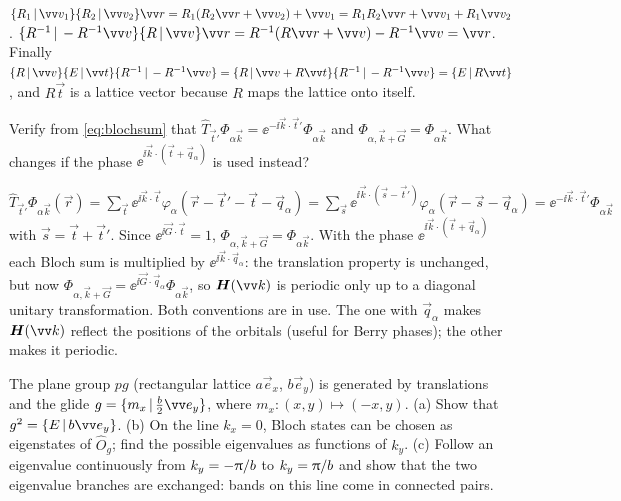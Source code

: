 \begin{solution}
$\seitz{R_1}{\vec{v}_1}\seitz{R_2}{\vec{v}_2}\vec{r}=R_1(R_2\vec{r}+\vec{v}_2)+\vec{v}_1
=R_1R_2\vec{r}+\vec{v}_1+R_1\vec{v}_2$.
$\seitz{R^{-1}}{-R^{-1}\vec{v}}\seitz{R}{\vec{v}}\vec{r}=R^{-1}(R\vec{r}+\vec{v})-R^{-1}\vec{v}=\vec{r}$.
Finally
$\seitz{R}{\vec{v}}\seitz{E}{\vec{t}}\seitz{R^{-1}}{-R^{-1}\vec{v}}
=\seitz{R}{\vec{v}+R\vec{t}}\seitz{R^{-1}}{-R^{-1}\vec{v}}=\seitz{E}{R\vec{t}}$, and $R\vec{t}$ is a
lattice vector because $R$ maps the lattice onto itself.
\end{solution}

\begin{exercise}\label{ex:6:bloch}
Verify from \eqref{eq:blochsum} that $\hat{T}_{\vec{t}'}\Phi_{\alpha\vec{k}}=
\ee^{-\ii\vec{k}\cdot\vec{t}'}\Phi_{\alpha\vec{k}}$ and $\Phi_{\alpha,\vec{k}+\vec{G}}=
\Phi_{\alpha\vec{k}}$. What changes if the phase $\ee^{\ii\vec{k}\cdot(\vec{t}+\vec{q}_\alpha)}$
is used instead?
\end{exercise}

\begin{solution}
$\hat{T}_{\vec{t}'}\Phi_{\alpha\vec{k}}(\vec{r})=\sum_{\vec{t}}\ee^{\ii\vec{k}\cdot\vec{t}}
\varphi_\alpha(\vec{r}-\vec{t}'-\vec{t}-\vec{q}_\alpha)=\sum_{\vec{s}}\ee^{\ii\vec{k}\cdot(\vec{s}-\vec{t}')}
\varphi_\alpha(\vec{r}-\vec{s}-\vec{q}_\alpha)=\ee^{-\ii\vec{k}\cdot\vec{t}'}\Phi_{\alpha\vec{k}}$
with $\vec{s}=\vec{t}+\vec{t}'$. Since $\ee^{\ii\vec{G}\cdot\vec{t}}=1$, $\Phi_{\alpha,\vec{k}+\vec{G}}=\Phi_{\alpha\vec{k}}$.
With the phase $\ee^{\ii\vec{k}\cdot(\vec{t}+\vec{q}_\alpha)}$ each Bloch sum is multiplied by
$\ee^{\ii\vec{k}\cdot\vec{q}_\alpha}$: the translation property is unchanged, but now
$\Phi_{\alpha,\vec{k}+\vec{G}}=\ee^{\ii\vec{G}\cdot\vec{q}_\alpha}\Phi_{\alpha\vec{k}}$, so $\mat{H}(\vec{k})$ is
periodic only up to a diagonal unitary transformation. Both conventions are in use.
The one with $\vec{q}_\alpha$ makes $\mat{H}(\vec{k})$ reflect the positions of the orbitals
(useful for Berry phases); the other makes it periodic.
\end{solution}

\begin{exercise}\label{ex:6:glide}
The plane group $pg$ (rectangular lattice $a\vec{e}_x$, $b\vec{e}_y$) is generated by
translations and the glide $g=\seitz{m_x}{\tfrac{b}{2}\vec{e}_y}$, where
$m_x\colon(x,y)\mapsto(-x,y)$. (a) Show that $g^2=\seitz{E}{b\vec{e}_y}$. (b) On the line
$k_x=0$, Bloch states can be chosen as eigenstates of $\hat{O}_g$; find the possible
eigenvalues as functions of $k_y$. (c) Follow an eigenvalue continuously from
$k_y=-\uppi/b$ to $k_y=\uppi/b$ and show that the two eigenvalue branches are exchanged:
bands on this line come in connected pairs.
\end{exercise}


